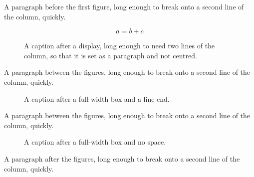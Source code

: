 \documentclass{article}
\begin{document}
A paragraph before the first figure, long enough to break onto a second line of
the column, quickly.
\begin{figure}[h]
  \centering
  \[ a = b + c \]
  \caption{A caption after a display, long enough to need two lines of the
    column, so that it is set as a paragraph and not centred.}
\end{figure}
A paragraph between the figures, long enough to break onto a second line of
the column, quickly.
\begin{figure}[h]\centering
  \makebox[\textwidth]{\rule{3cm}{1cm}}
  \caption{A caption after a full-width box and a line end.}
\end{figure}
A paragraph between the figures, long enough to break onto a second line of
the column, quickly.
\begin{figure}[h]\centering
  \makebox[\textwidth]{\rule{3cm}{1cm}}%
  \caption{A caption after a full-width box and no space.}
\end{figure}
A paragraph after the figures, long enough to break onto a second line of the
column, quickly.
\end{document}
